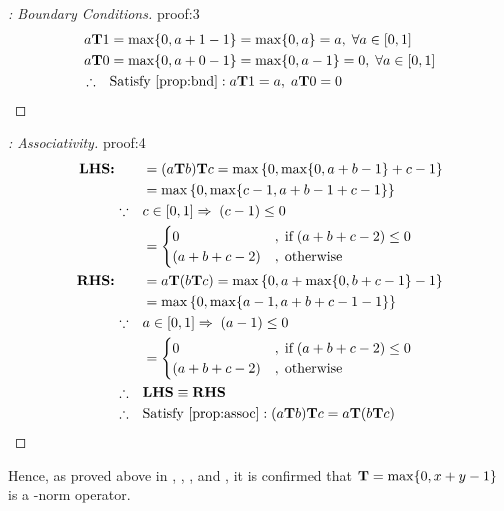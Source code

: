 \documentclass{tron}
\begin{document}
\begin{proof}[: Boundary Conditions]{proof:3}
	\begin{align}
		a\T 1  & = \max \{0, a + 1 - 1\} = \max\{0, a\} = a ,\; \forall a\in[0,1]\\
		a\T 0  & = \max \{0, a + 0 - 1\} = \max\{0, a-1 \} = 0,\; \forall a\in[0,1]\\
		\therefore \quad & \text{Satisfy \Cref{prop:bnd}}: a\T 1 = a,\; a\T 0 = 0
	\end{align}
	\QED
\end{proof}

\clearpage
\begin{proof}[: Associativity]{proof:4}
	\begin{align}
		\textbf{LHS:}\qquad & = (a\T b)\T c = \max \left\{ 0, \max \{0, a + b - 1\} + c - 1\right\} \\
							& =  \max \left\{ 0, \max \{c - 1, a + b - 1 + c - 1 \}\right\} \\
						\because \quad & c \in [0,1] \Rightarrow \; (c - 1) \leq 0 \\
							& = \begin{cases}
								0 & \ifcond (a + b + c - 2) \leq 0 \\
								(a + b + c - 2) & \otherwise
							\end{cases} \\
		\textbf{RHS:}\qquad & = a\T(b\T c) = \max \left\{ 0, a + \max \{0, b + c - 1\} - 1\right\} \\
							& =  \max \left\{ 0, \max \{a - 1, a + b + c - 1 - 1\} \right\} \\
						\because \quad & a \in [0,1] \Rightarrow \; (a - 1) \leq 0 \\
							& = \begin{cases}
								0 & \ifcond (a + b + c - 2) \leq 0 \\
								(a + b + c - 2) & \otherwise
							\end{cases} \\
		\therefore \quad & \textbf{LHS} \equiv \textbf{RHS}\\
		\therefore \quad & \text{Satisfy \Cref{prop:assoc}}: (a\T b)\T c = a\T(b\T c)
	\end{align}
	\QED
\end{proof}

Hence, as proved above in , , , and , it is confirmed that $\textbf{T} = \max \{0, x+y - 1\}$ is a \T-norm operator.
\end{document}
